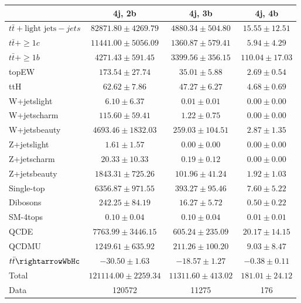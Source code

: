 \begin{table}
\begin{center}
  \begin{tabular}{ | l |  c |  c |  c | }
    \hline \hline 
     & 4j, 2b  & 4j, 3b  & 4j, 4b  \\ 
    \hline 
     $t\bar{t}+\text{light jets}-jets$  &   $ 82871.80 \pm 4269.79 $ &   $ 4880.34 \pm 504.80 $ &   $ 15.55 \pm 12.51 $ \\ 
     $t\bar{t}+\geq1c$  &   $ 11441.00 \pm 5056.09 $ &   $ 1360.87 \pm 579.41 $ &   $ 5.94 \pm 4.29 $ \\ 
     $t\bar{t}+\geq1b$  &   $ 4271.43 \pm 591.45 $ &   $ 3399.56 \pm 356.15 $ &   $ 110.04 \pm 17.03 $ \\ 
    topEW  &   $ 173.54 \pm 27.74 $ &   $ 35.01 \pm 5.88 $ &   $ 2.69 \pm 0.54 $ \\ 
    ttH  &   $ 62.62 \pm 7.86 $ &   $ 47.27 \pm 6.27 $ &   $ 4.68 \pm 0.69 $ \\ 
    W+jetslight  &   $ 6.10 \pm 6.37 $ &   $ 0.01 \pm 0.01 $ &   $ 0.00 \pm 0.00 $ \\ 
    W+jetscharm  &   $ 115.60 \pm 59.41 $ &   $ 1.22 \pm 0.75 $ &   $ 0.00 \pm 0.00 $ \\ 
    W+jetsbeauty  &   $ 4693.46 \pm 1832.03 $ &   $ 259.03 \pm 104.51 $ &   $ 2.87 \pm 1.35 $ \\ 
    Z+jetslight  &   $ 1.61 \pm 1.57 $ &   $ 0.00 \pm 0.00 $ &   $ 0.00 \pm 0.00 $ \\ 
    Z+jetscharm  &   $ 20.33 \pm 10.33 $ &   $ 0.19 \pm 0.12 $ &   $ 0.00 \pm 0.00 $ \\ 
    Z+jetsbeauty  &   $ 1843.31 \pm 725.26 $ &   $ 101.96 \pm 41.24 $ &   $ 1.92 \pm 1.03 $ \\ 
    Single-top  &   $ 6356.87 \pm 971.55 $ &   $ 393.27 \pm 95.46 $ &   $ 7.60 \pm 5.22 $ \\ 
    Dibosons  &   $ 242.25 \pm 84.19 $ &   $ 16.27 \pm 5.72 $ &   $ 0.50 \pm 0.22 $ \\ 
    SM-4tops  &   $ 0.10 \pm 0.04 $ &   $ 0.10 \pm 0.04 $ &   $ 0.01 \pm 0.01 $ \\ 
    QCDE  &   $ 7763.99 \pm 3446.15 $ &   $ 605.24 \pm 235.09 $ &   $ 20.17 \pm 14.15 $ \\ 
    QCDMU  &   $ 1249.61 \pm 635.92 $ &   $ 211.26 \pm 100.20 $ &   $ 9.03 \pm 8.47 $ \\ 
     $t\bar{t}\rightarrowWbHc$  &   $ -30.50 \pm 1.63 $ &   $ -18.57 \pm 1.27 $ &   $ -0.38 \pm 0.11 $ \\ 
    Total  &   $ 121114.00 \pm 2259.34 $ &   $ 11311.60 \pm 413.02 $ &   $ 181.01 \pm 24.12 $ \\ 
    \hline 
    Data  & 120572  & 11275  & 176  \\ 
    \hline \hline 
  \end{tabular} 



\end{center}
\end{table}
